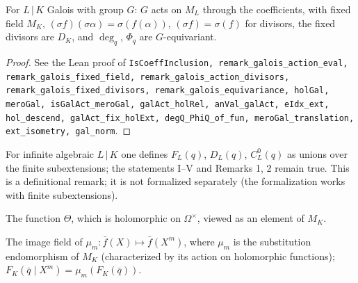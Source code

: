 \begin{remark}
\label{rem:S2-galois}
\leanok
For $L\,|\,K$ Galois with group $G$: $G$ acts on $M_L$ through the coefficients, with fixed field $M_K$, $(\sigma f)(\sigma\alpha)=\sigma(f(\alpha))$, $(\sigma f)=\sigma(f)$ for divisors, the fixed divisors are $D_K$, and $\deg_q$, $\Phi_q$ are $G$-equivariant.
\end{remark}
\begin{proof}
\leanok
See the Lean proof of \texttt{IsCoeffInclusion, remark\_galois\_action\_eval, remark\_galois\_fixed\_field, remark\_galois\_action\_divisors, remark\_galois\_fixed\_divisors, remark\_galois\_equivariance, holGal, meroGal, isGalAct\_meroGal, galAct\_holRel, anVal\_galAct, eIdx\_ext, hol\_descend, galAct\_fix\_holExt, degQ\_PhiQ\_of\_fun, meroGal\_translation, ext\_isometry, gal\_norm}.
\end{proof}

\begin{remark}
\label{rem:S2-infinite}
\notready
For infinite algebraic $L\,|\,K$ one defines $F_L(q)$, $D_L(q)$, $C^0_L(q)$ as unions over the finite subextensions; the statements I--V and Remarks 1, 2 remain true. This is a definitional remark; it is not formalized separately (the formalization works with finite subextensions).
\end{remark}

\begin{definition}[$\Theta$ in $M_K$]
\label{def:theta-M}
\leanok
The function $\Theta$, which is holomorphic on $\Omega^\times$, viewed as an element of $M_K$.
\end{definition}

\begin{definition}
\label{def:Fq-qbar-Xm}
\leanok
The image field of $\mu_m:\bar f(X)\mapsto\bar f(X^m)$, where $\mu_m$ is the substitution endomorphism of $M_K$ (characterized by its action on holomorphic functions); $F_K(\bar q\mid X^m)=\mu_m(F_K(\bar q))$.
\end{definition}

